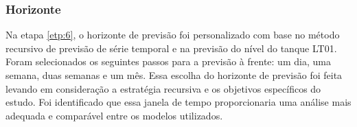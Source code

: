 \subsubsection{Horizonte}

Na etapa \ref{etp:6}, o horizonte de previsão foi personalizado com base no método recursivo de previsão de série temporal e na previsão do nível do tanque LT01. Foram selecionados os seguintes passos para a previsão à frente: um dia, uma semana, duas semanas e um mês. Essa escolha do horizonte de previsão foi feita levando em consideração a estratégia recursiva e os objetivos específicos do estudo. Foi identificado que essa janela de tempo proporcionaria uma análise mais adequada e comparável entre os modelos utilizados.